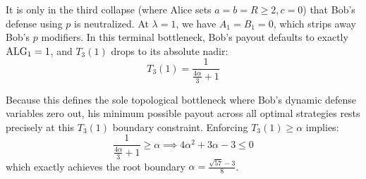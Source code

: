 \documentclass[11pt]{article}
\newcommand{\ALG}{\textnormal{ALG}}
\begin{document}
It is only in the third collapse (where Alice sets $a = b = R \ge 2, c = 0$) that Bob's defense using $p$ is neutralized. At $\lambda = 1$, we have $A_1 = B_1 = 0$, which strips away Bob's $p$ modifiers. In this terminal bottleneck, Bob's payout defaults to exactly $\ALG_1 = 1$, and $T_3(1)$ drops to its absolute nadir:
\[ T_3(1) = \frac{1}{\frac{4\alpha}{3} + 1} \]

Because this defines the sole topological bottleneck where Bob's dynamic defense variables zero out, his minimum possible payout across all optimal strategies rests precisely at this $T_3(1)$ boundary constraint. Enforcing $T_3(1) \ge \alpha$ implies:
\[ \frac{1}{\frac{4\alpha}{3} + 1} \ge \alpha \implies 4\alpha^2 + 3\alpha - 3 \le 0 \]
which exactly achieves the root boundary $\alpha = \frac{\sqrt{57}-3}{8}$.
\end{document}
